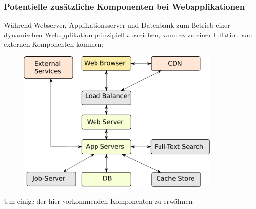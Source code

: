 \subsubsection{Potentielle zusätzliche Komponenten bei Webapplikationen}

Während Webserver, Applikationsserver und Datenbank zum Betrieb einer dynamischen Webapplikation prinzipiell ausreichen, kann es zu einer Inflation von externen Komponenten kommen:

\begin{figure}[h!]
\includegraphics[width=10cm]{images/web_components.pdf}
\centering
\end{figure}

Um einige der hier vorkommenden Komponenten zu erwähnen:

